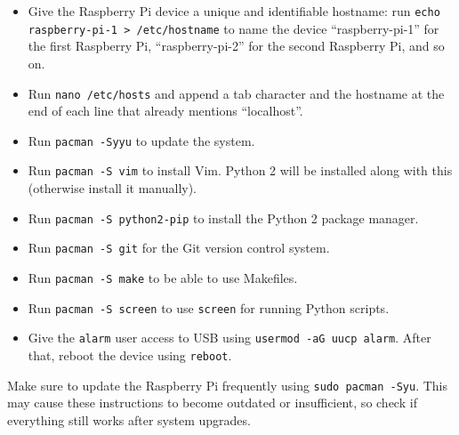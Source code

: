 \documentclass{article}
\begin{document}
\begin{itemize}
    \item Give the Raspberry Pi device a unique and identifiable hostname: run 
          {\tt echo raspberry-pi-1 > /etc/hostname} to name the device 
          ``raspberry-pi-1'' for the first Raspberry Pi, ``raspberry-pi-2'' for 
          the second Raspberry Pi, and so on.
    \item Run {\tt nano /etc/hosts} and append a tab character and the hostname 
          at the end of each line that already mentions ``localhost''.
    \item Run {\tt pacman -Syyu} to update the system.
    \item Run {\tt pacman -S vim} to install Vim. Python 2 will be installed 
          along with this (otherwise install it manually).
    \item Run {\tt pacman -S python2-pip} to install the Python 2 package 
          manager.
    \item Run {\tt pacman -S git} for the Git version control system.
    \item Run {\tt pacman -S make} to be able to use Makefiles.
    \item Run {\tt pacman -S screen} to use {\tt screen} for running Python
          scripts.
    \item Give the {\tt alarm} user access to USB using
          {\tt usermod -aG uucp alarm}. After that, reboot the device using
          {\tt reboot}.
\end{itemize}

Make sure to update the Raspberry Pi frequently using {\tt sudo pacman -Syu}. 
This may cause these instructions to become outdated or insufficient, so check 
if everything still works after system upgrades.
\end{document}
